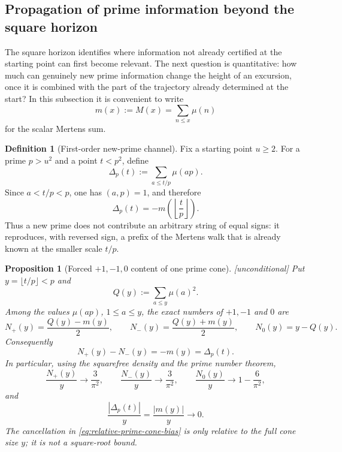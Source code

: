 \documentclass[11pt,reqno]{amsart}
\theoremstyle{plain}
\newtheorem{proposition}[theorem]{Proposition}
\theoremstyle{definition}
\newtheorem{definition}[theorem]{Definition}
\begin{document}
\subsection{Propagation of prime information beyond the square horizon}
\label{subsec:prime-copy-propagation}

The square horizon identifies where information not already certified at the
starting point can first become relevant.  The next question is quantitative:
how much can genuinely new prime information change the height of an excursion,
once it is combined with the part of the trajectory already determined at the
start?  In this subsection it is convenient to write
\[
  m(x):=M(x)=\sum_{n\le x}\mu(n)
\]
for the scalar Mertens sum.

\begin{definition}[First-order new-prime channel]
\label{def:first-order-channel}
Fix a starting point $u\ge2$.  For a prime $p>u^2$ and a point $t<p^2$, define
\[
  \Delta_p(t):=\sum_{a\le t/p}\mu(ap).
\]
Since $a<t/p<p$, one has $(a,p)=1$, and therefore
\begin{equation}
\label{eq:single-prime-copy}
  \boxed{\qquad
  \Delta_p(t)=-m\!\left(\left\lfloor\frac{t}{p}\right\rfloor\right).
  \qquad}
\end{equation}
Thus a new prime does not contribute an arbitrary string of equal signs: it
reproduces, with reversed sign, a prefix of the Mertens walk that is already
known at the smaller scale $t/p$.
\end{definition}

\begin{proposition}[Forced $+1,-1,0$ content of one prime cone]
\label{prop:prime-cone-signs}
\emph{[unconditional]} Put $y=\lfloor t/p\rfloor<p$ and
\[
  Q(y):=\sum_{a\le y}\mu(a)^2.
\]
Among the values $\mu(ap)$, $1\le a\le y$, the exact numbers of $+1,-1$ and
$0$ are
\begin{equation}
\label{eq:prime-cone-counts}
  N_+(y)=\frac{Q(y)-m(y)}2,\qquad
  N_-(y)=\frac{Q(y)+m(y)}2,\qquad
  N_0(y)=y-Q(y).
\end{equation}
Consequently
\[
  N_+(y)-N_-(y)=-m(y)=\Delta_p(t).
\]
In particular, using the squarefree density and the prime number theorem,
\[
  \frac{N_+(y)}y\to\frac3{\pi^2},\qquad
  \frac{N_-(y)}y\to\frac3{\pi^2},\qquad
  \frac{N_0(y)}y\to1-\frac6{\pi^2},
\]
and
\begin{equation}
\label{eq:relative-prime-cone-bias}
  \frac{|\Delta_p(t)|}{y}=\frac{|m(y)|}{y}\longrightarrow0.
\end{equation}
The cancellation in \eqref{eq:relative-prime-cone-bias} is only relative to
the full cone size $y$; it is not a square-root bound.
\end{proposition}
\end{document}
